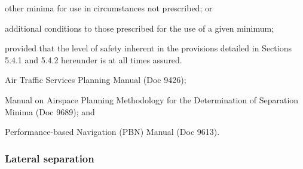 \begin{noteev}
    \begin{enumalph}
        \item other minima for use in circumstances not prescribed; or
        \item additional conditions to those prescribed for the use of a given minimum;
    \end{enumalph}
    \noindent provided that the level of safety inherent in the provisions detailed in Sections 5.4.1 and 5.4.2 hereunder is at all times assured.

    \begin{enumalph}
        \item \textup{Air Traffic Services Planning Manual} (Doc 9426);
        \item \textup{Manual on Airspace Planning Methodology for the Determination of Separation Minima} (Doc 9689); and
        \item \textup{Performance-based Navigation (PBN) Manual} (Doc 9613).
    \end{enumalph}

\end{noteev}

\subsubsection{Lateral separation}

